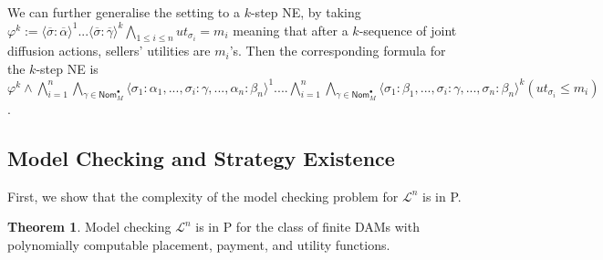 \documentclass[letterpaper]{article} %
\theoremstyle{definition}
\newtheorem{theorem}{Theorem}
\newcommand{\munyque}[1]{{[\color{red}#1]}}
\newcommand{\laurent}[1]{{[\color{purple}#1]}}
\begin{document}
We can further generalise the setting to a $k$-step NE, by taking $\varphi^k := \langle \overline{\sigma}: \overline{\alpha}\rangle^1 ... \langle \overline{\sigma}: \overline{\gamma}\rangle^k \bigwedge_{1\leqslant i \leqslant n} ut_{\sigma_i} = m_i$ meaning that after a $k$-sequence of joint diffusion actions, sellers' utilities are $m_i$'s. Then the corresponding formula for the $k$-step NE is $\varphi^k \land \bigwedge_{i = 1}^n \bigwedge_{\gamma \in \mathsf{Nom}^{\bullet}_M} \langle\sigma_1: \alpha_1, ..., \sigma_i:\gamma, ..., \alpha_n: \beta_n \rangle^1 .... \bigwedge_{i = 1}^n \bigwedge_{\gamma \in \mathsf{Nom}^{\bullet}_M} \langle\sigma_1: \beta_1, ..., \sigma_i:\gamma, ..., \sigma_n: \beta_n \rangle^k (ut_{\sigma_i} \leqslant m_i)$.

\subsection{Model Checking and Strategy Existence}
First, we show that the complexity of the model checking problem for $\mathcal{L}^n$ is in P.

\begin{theorem}
Model checking $\mathcal{L}^n$ is in P for the class of finite DAMs with polynomially computable placement, payment, and utility functions. %
\end{theorem}
\end{document}
